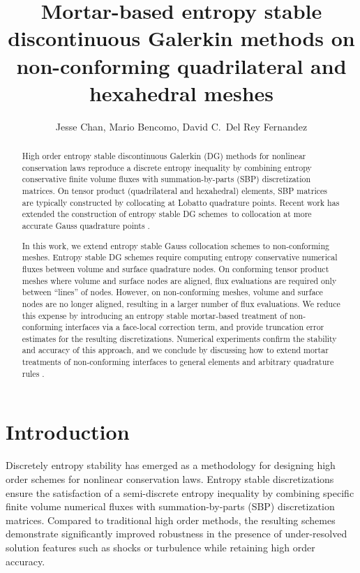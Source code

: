 \documentclass{svjour3}                     %
\date{}
\author{Jesse Chan, Mario Bencomo, David C.\ Del Rey Fernandez}
\title{Mortar-based entropy stable discontinuous Galerkin methods on non-conforming quadrilateral and hexahedral meshes}
\begin{document}
\maketitle

\begin{abstract}
High order entropy stable discontinuous Galerkin (DG) methods for nonlinear conservation laws reproduce a discrete entropy inequality by combining entropy conservative finite volume fluxes with summation-by-parts (SBP) discretization matrices.  On tensor product (quadrilateral and hexahedral) elements, SBP matrices are typically constructed by collocating at Lobatto quadrature points.  Recent work has extended the construction of entropy stable DG schemes to collocation at more accurate Gauss quadrature points \cite{chan2018efficient}.  

In this work, we extend entropy stable Gauss collocation schemes to non-conforming meshes.  Entropy stable DG schemes require computing entropy conservative numerical fluxes between volume and surface quadrature nodes.  On conforming tensor product meshes where volume and surface nodes are aligned, flux evaluations are required only between ``lines'' of nodes.  However, on non-conforming meshes, volume and surface nodes are no longer aligned, resulting in a larger number of flux evaluations.  We reduce this expense by introducing an entropy stable mortar-based treatment of non-conforming interfaces via a face-local correction term, and provide truncation error estimates for the resulting discretizations.  Numerical experiments confirm the stability and accuracy of this approach, and we conclude by discussing how to extend mortar treatments of non-conforming interfaces to general elements and arbitrary quadrature rules \cite{chan2017discretely}.  
\end{abstract}



\section{Introduction}
Discretely entropy stability has emerged as a methodology for designing high order schemes for nonlinear conservation laws.  Entropy stable discretizations ensure the satisfaction of a semi-discrete entropy inequality by combining specific finite volume numerical fluxes with summation-by-parts (SBP) discretization matrices.  Compared to traditional high order methods, the resulting schemes demonstrate significantly improved robustness in the presence of under-resolved solution features such as shocks or turbulence while retaining high order accuracy.  
\end{document}
